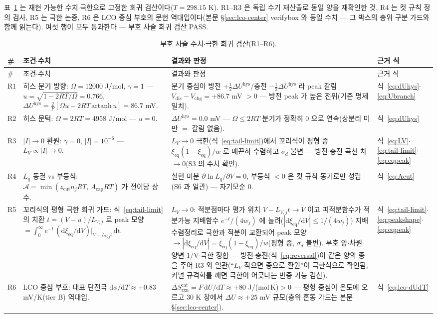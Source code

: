 \documentclass[11pt,a4paper]{article}
\newcommand{\dd}{\mathrm{d}}
\newcommand{\eq}{\mathrm{eq}}
\newcommand{\rxn}{\mathrm{rxn}}
\newcommand{\dis}{\mathrm{dis}}
\newcommand{\chg}{\mathrm{chg}}
\newcommand{\hys}{\mathrm{hys}}
\begin{document}
표~\ref{tab:signcheck-R} 는 재현 가능한 수치$\cdot$극한으로 고정한 회귀 검산이다($T=298.15$ K).
R1--R3 은 독립 수기 재산출로 동일 양을 재확인한 것, R4 는 컷 규칙 정의 검사, R5 는 극한 논증,
R6 은 LCO 중심 부호의 문헌 역대입이다(본문 \S\ref{sec:lco-center} verifybox 와 동일 수치 ---
그 박스의 층위 구분 가드와 함께 읽는다). 여섯 행이 모두 통과한다 --- 부호 사슬 회귀 검산 PASS.

\begin{longtable}{@{}l p{6.4cm} p{5.2cm} p{2.4cm}@{}}
\caption{부호 사슬 수치$\cdot$극한 회귀 검산(R1--R6).}\label{tab:signcheck-R}\\
\toprule
\# & 조건$\cdot$수치 & 결과와 판정 & 근거 식 \\
\midrule
\endfirsthead
\toprule
\# & 조건$\cdot$수치 & 결과와 판정 & 근거 식 \\
\midrule
\endhead
R1 & 히스 분기 방향: $\Omega=12000$ J/mol, $\gamma=1$ ---
$u=\sqrt{1-2RT/\Omega}=0.766$, $\Delta U^\hys=\frac{2}{F}[\Omega u-2RT\,\mathrm{artanh}\,u]=86.7$ mV.
& 분기 중심이 방전 $+\tfrac12\Delta U^\hys$/충전 $-\tfrac12\Delta U^\hys$ 라 peak 갈림
$V_\dis-V_\chg=+86.7$ mV $>0$ --- 방전 peak 가 높은 전위(기준 명제 일치).
& 식~\eqref{eq:dUhys}$\cdot$\eqref{eq:Ubranch} \\
R2 & 히스 문턱: $\Omega=2RT=4958$ J/mol --- $u=0$.
& $\Delta U^\hys=0.0$ mV --- $\Omega\le2RT$ 분기가 정확히 $0$ 으로 연속(상분리 미만 $=$ 갈림 없음).
& 식~\eqref{eq:dUhys} \\
R3 & $|I|\!\to\!0$ 환원: $\gamma=0$, $|I|=10^{-6}$ --- $L_V\propto|I|\to0$.
& $L_V\to0$ 극한(식~\eqref{eq:tail-limit})에서 꼬리식이 평형 종 $\xi_\eq(1-\xi_\eq)/w$ 로 매끈히 수렴하고 $\sigma_d$ 불변 ---
방전$\cdot$충전 곡선 차 $\to0$(S3 의 수치 확인).
& 식~\eqref{eq:LV}$\cdot$ \eqref{eq:tail-limit}$\cdot$\eqref{eq:eqpeak} \\
R4 & $L_q$ 동결 vs 부등식: $\mathcal A=\min(z_\mathrm{cut}n_jRT,\,A_\mathrm{cap}RT)$ 가 전이당 상수.
& 실현 미분 $\partial\ln L_q/\partial V=0$, 부등식 $<0$ 은 컷 규칙 동기로만 성립(S6 과 일관) ---
자기모순 $0$. & 식~\eqref{eq:Acut} \\
R5 & 꼬리식의 평형 극한 회귀 가드: 식~\eqref{eq:tail-limit} 의 치환 $t=(V-u)/L_{V,j}$ 로
peak 모양 $=\int_0^\infty e^{-t}\,(\dd\xi_\eq/\dd V)|_{V-L_{V,j}t}\,\dd t$.
& $L_V\to0$: 적분점마다 평가 위치 $V-L_{V,j}t\to V$ 이고 피적분함수가 적분가능 지배함수 $e^{-t}/(4w_j)$ 에
눌려($|\dd\xi_\eq/\dd V|\le1/(4w_j)$) 지배수렴정리로 극한과 적분이 교환되어 peak 모양
$\to|\dd\xi_\eq/\dd V|=\xi_\eq(1-\xi_\eq)/w$(평형 종, $\sigma_d$ 불변). 부호 양$\cdot$차원 양변 $1/$V$\cdot$극한 정합
--- 방전$\cdot$충전(식~\eqref{eq:reversal})이 같은 양의 종을 주어 R3 와 일관(``$L_V$ 작으면 종으로 환원''이
극한식으로 확인됨; 커널 규격화를 깨면 극한이 어긋나는 반증 가능 검산).
& 식~\eqref{eq:tail-limit}$\cdot$ \eqref{eq:peakshape}$\cdot$ \eqref{eq:eqpeak} \\
R6 & LCO 중심 부호: 대표 단전극 $\dd\phi/\dd T\approx+0.83$ mV/K(tier B)\cite{swiderska2019} 역대입.
& $\Delta S_{\rxn}^\mathrm{cat}=F\,\dd U/\dd T\approx+80$ J/(mol\,K)$>0$ --- 평형 중심이 온도에 오르고
$30$ K 창에서 $\Delta U\approx+25$ mV 규모(층위$\cdot$혼동 가드는 본문 \S\ref{sec:lco-center}).
& 식~\eqref{eq:lco-dUdT} \\
\bottomrule
\end{longtable}
\end{document}
